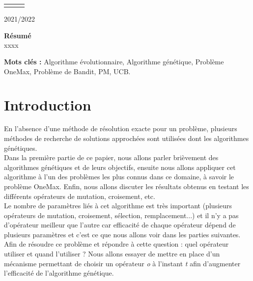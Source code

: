 \documentclass[12pt]{article}
\begin{document}
\begin{table}[H]
\begin{tabular}{lll}
&&\\

\end{tabular}

\end{table}

\begin{center}
2021/2022
\end{center}


\newpage
\renewcommand\headrulewidth{1 pt}\fancyhead[L]{}\fancyhead[C]{} 
\thispagestyle{empty}
\tableofcontents

\newpage
\renewcommand\headrulewidth{1 pt}\fancyhead[L]{}\fancyhead[C]{} 
\setcounter{page}{1}

\textbf{Résumé}\\

xxxx

\textbf{Mots clés : } Algorithme évolutionnaire, Algorithme génétique, Problème OneMax, Problème de Bandit, PM, UCB.

\section{Introduction}
En l'absence d'une méthode de résolution exacte pour un problème, plusieurs méthodes de recherche de solutions approchées sont utilisées dont les algorithmes génétiques.\\
 
Dans la première partie de ce papier, nous allons parler brièvement des algorithmes génétiques et de leurs objectifs, ensuite nous allons appliquer cet algorithme à l'un des problèmes les plus connus dans ce domaine, à savoir le problème OneMax. Enfin, nous allons discuter les résultats obtenus en testant les différents opérateurs de mutation, croisement, etc.\\

Le nombre de paramètres liés à cet algorithme est très important (plusieurs opérateurs de mutation, croisement, sélection, remplacement...) et il n'y a pas d'opérateur meilleur que l'autre car efficacité de chaque opérateur dépend de plusieurs paramètres et c'est ce que nous allons voir dans les parties suivantes. Afin de résoudre ce problème et répondre à cette question : quel opérateur utiliser et quand l'utiliser ? Nous allons essayer de mettre en place d'un mécanisme permettant de choisir un opérateur \textit{o} à l'instant \textit{t} afin d'augmenter l'efficacité de l'algorithme génétique.\\
\end{document}
